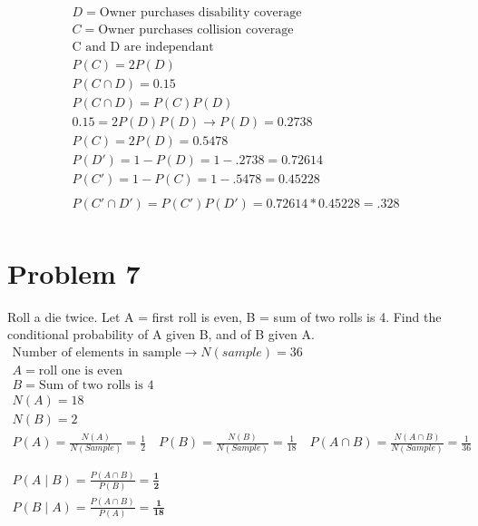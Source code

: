 \documentclass{article}
\begin{document}
	\begin{align*}
	D = \text{Owner purchases disability coverage}\\
	C = \text{Owner purchases collision coverage}\\
	\text{C and D are independant}\\
	P(C) = 2P(D) \\
	P(C \cap D) = 0.15\\
	P(C \cap D) = P(C) P(D)\\
	0.15 = 2P(D) P(D) \rightarrow P(D) = 0.2738\\
	P(C) = 2P(D) = 0.5478 \\
	P(D') = 1-P(D) = 1-.2738 = 0.72614\\
	P(C') = 1-P(C) = 1-.5478 = 0.45228\\\\
	P(C' \cap D') = P(C') P(D') = 0.72614 * 0.45228 = \mathbf{ .328}\\
	\end{align*}


\section*{Problem 7} 
Roll a die twice. Let A = {first roll is even}, B = {sum of two rolls is 4}. Find the conditional probability of A given B, and of B given A.  
	\begin{align*}
	\text{Number of elements in sample}  \rightarrow N(sample) = 36\\
	A = \text{{roll one is even}}\\
	B = \text{{Sum of two rolls is 4}} \\
	N(A) = 18\\
	N(B) = 2\\
	P(A) = \frac{N(A)}{N(Sample)} = \frac{1}{2}\quad
	P(B) = \frac{N(B)}{N(Sample)} = \frac{1}{18} \quad 
	P(A \cap B) = \frac{N(A\cap B)}{N(Sample)} = \frac{1}{36} \\\\\\
	P(A \mid B) = \frac{P(A \cap B)}{P(B)} =\mathbf{ \frac{1}{2}} \\
	P(B \mid A) = \frac{P(A \cap B)}{P(A)}= \mathbf{\frac{1}{18}} \\
	\end{align*}
	
\end{document}
